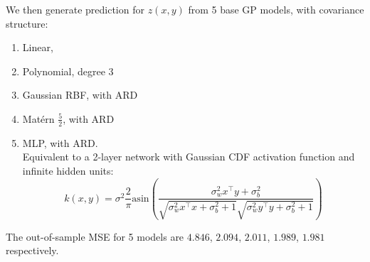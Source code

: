 \documentclass[11pt]{article}
\theoremstyle{definition}
\begin{document}
We then generate prediction for $z(x, y)$ from 5 base GP models, with covariance structure:
\begin{enumerate}
\item Linear, 
\item Polynomial, degree 3
\item Gaussian RBF, with ARD
\item Mat\'{e}rn $\frac{5}{2}$, with ARD
\item MLP, with ARD.\\ 
Equivalent to a 2-layer network with Gaussian CDF activation function and infinite hidden units:
$$k(x,y) = \sigma^{2}\frac{2}{\pi }  \text{asin} \left ( \frac{ \sigma_w^2 x^\top y+\sigma_b^2}{\sqrt{\sigma_w^2x^\top x + \sigma_b^2 + 1}\sqrt{\sigma_w^2 y^\top y + \sigma_b^2 +1}} \right )$$
\end{enumerate} 
The out-of-sample MSE for 5 models are $4.846$, $2.094$, $2.011$, $1.989$, $1.981$ respectively.



\clearpage

\end{document}
